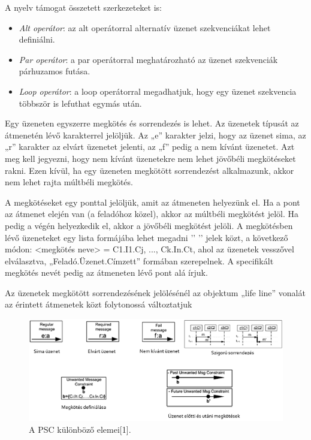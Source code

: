 A nyelv támogat összetett szerkezeteket is:

\begin{itemize}
    \item \textit{Alt operátor}: az alt operátorral alternatív üzenet szekvenciákat lehet definiálni.
    \item \textit{Par operátor}: a par operátorral meghatározható az üzenet szekvenciák párhuzamos futása.
    \item \textit{Loop operátor}: a loop operátorral megadhatjuk, hogy egy üzenet szekvencia többször is lefuthat egymás után.
\end{itemize}

Egy üzeneten egyszerre megkötés és sorrendezés is lehet.
Az üzenetek típusát az átmenetén lévő karakterrel jelöljük.
Az „e” karakter jelzi, hogy az üzenet sima, az „r” karakter az elvárt üzenetet jelenti, az „f” pedig a nem kívánt üzenetet.
Azt meg kell jegyezni, hogy nem kívánt üzenetekre nem lehet jövőbéli megkötéseket rakni.
Ezen kívül, ha egy üzeneten megkötött sorrendezést alkalmazunk, akkor nem lehet rajta múltbéli megkötés.

A megkötéseket egy ponttal jelöljük, amit az átmeneten helyezünk el.
Ha a pont az átmenet elején van (a feladóhoz közel), akkor az múltbéli megkötést jelöl.
Ha pedig a végén helyezkedik el, akkor a jövőbéli megkötést jelöli.
A megkötésben lévő üzeneteket egy lista formájába lehet megadni ’{’ ’}’ jelek közt, a következő módon: <megkötés neve> = {C1.I1.Cj, ..., Ck.In.Ct}, ahol az üzenetek vesszővel elválasztva, „Feladó.Üzenet.Címzett” formában szerepelnek.
A specifikált megkötés nevét pedig az átmeneten lévő pont alá írjuk.

Az üzenetek megkötött sorrendezésének jelölésénél az objektum „life line” vonalát az érintett átmenetek közt folytonossá változtatjuk

\begin{figure}[!ht]
    \centering
    \includegraphics[width=150mm, keepaspectratio]{figures/2abra.png}
    \caption{A PSC különböző elemei[1].}
\end{figure}

